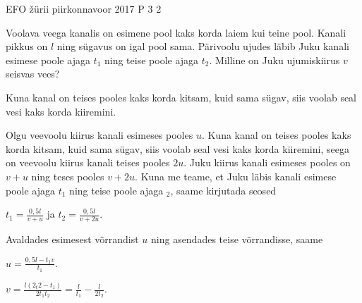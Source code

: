 {EFO žürii} %
{piirkonnavoor} %
{2017} %
{P 3} %
{2} %
{

\ifStatement
Voolava veega kanalis on esimene pool kaks korda laiem kui teine pool. Kanali pikkus on $l$ ning sügavus on igal pool sama. Pärivoolu ujudes läbib Juku kanali esimese poole ajaga $t_1$ ning teise poole ajaga $t_2$. Milline on Juku ujumiskiirus $v$ seisvas vees?
\fi

\ifHint
Kuna kanal on teises pooles kaks korda kitsam, kuid sama sügav, siis voolab seal vesi kaks korda kiiremini.
\fi

\ifSolution
Olgu veevoolu kiirus kanali esimeses pooles $u$. Kuna kanal on teises pooles kaks korda kitsam, kuid sama sügav, siis voolab seal vesi kaks korda kiiremini, seega on veevoolu kiirus kanali teises pooles $2u$. Juku kiirus kanali esimeses pooles on $v + u$ ning teses pooles $v + 2u$. Kuna me teame, et Juku läbis kanali esimese poole ajaga $t_1$ ning teise poole ajaga $_2$, saame kirjutada seosed
\begin{center}
$t_1 = \frac{0,5l}{v + u}$ ja $t_2 = \frac{0,5 l}{v + 2u}$. 
\end{center}
Avaldades esimesest võrrandist $u$ ning asendades teise võrrandisse, saame
\begin{center}
$u = \frac{0,5l - t_1 v}{t_1}$.
\end{center}
\begin{center}
$v = \frac{l(2_t2 - t_1)}{2t_1t_2} = \frac{l}{t_1} - \frac{l}{2t_2}$.
\end{center}
\fi
}